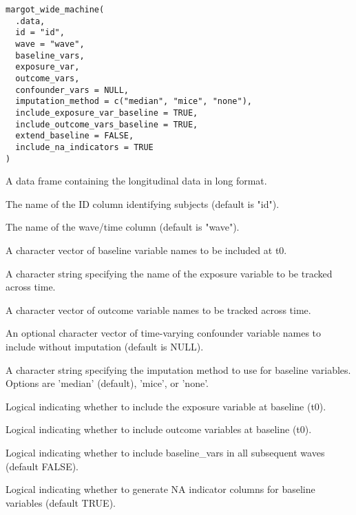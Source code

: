 \documentclass[a4paper]{book}
\begin{document}
%
\begin{Usage}
\begin{verbatim}
margot_wide_machine(
  .data,
  id = "id",
  wave = "wave",
  baseline_vars,
  exposure_var,
  outcome_vars,
  confounder_vars = NULL,
  imputation_method = c("median", "mice", "none"),
  include_exposure_var_baseline = TRUE,
  include_outcome_vars_baseline = TRUE,
  extend_baseline = FALSE,
  include_na_indicators = TRUE
)
\end{verbatim}
\end{Usage}
%
\begin{Arguments}
\begin{ldescription}
\item[\code{.data}] A data frame containing the longitudinal data in long format.

\item[\code{id}] The name of the ID column identifying subjects (default is "id").

\item[\code{wave}] The name of the wave/time column (default is "wave").

\item[\code{baseline\_vars}] A character vector of baseline variable names to be included at t0.

\item[\code{exposure\_var}] A character string specifying the name of the exposure variable to be tracked across time.

\item[\code{outcome\_vars}] A character vector of outcome variable names to be tracked across time.

\item[\code{confounder\_vars}] An optional character vector of time-varying confounder variable names to include without imputation (default is NULL).

\item[\code{imputation\_method}] A character string specifying the imputation method to use for baseline variables. Options are 'median' (default), 'mice', or 'none'.

\item[\code{include\_exposure\_var\_baseline}] Logical indicating whether to include the exposure variable at baseline (t0).

\item[\code{include\_outcome\_vars\_baseline}] Logical indicating whether to include outcome variables at baseline (t0).

\item[\code{extend\_baseline}] Logical indicating whether to include baseline\_vars in all subsequent waves (default FALSE).

\item[\code{include\_na\_indicators}] Logical indicating whether to generate NA indicator columns for baseline variables (default TRUE).
\end{ldescription}
\end{Arguments}
\end{document}
